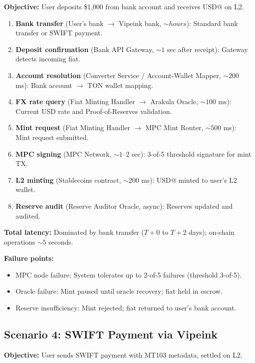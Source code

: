 \documentclass[12pt,a4paper]{article}
\theoremstyle{definition}
\theoremstyle{remark}
\newcommand{\USD}[1]{\$#1}
\begin{document}
\textbf{Objective:} User deposits \USD{1{,}000} from bank account and receives USD@ on L2.

\begin{enumerate}[nosep]
    \item \textbf{Bank transfer} (User's bank $\to$ Vipeink bank, ${\sim}hours$): Standard bank transfer or SWIFT payment.
    \item \textbf{Deposit confirmation} (Bank API Gateway, ${\sim}1$ sec after receipt): Gateway detects incoming fiat.
    \item \textbf{Account resolution} (Converter Service / Account-Wallet Mapper, ${\sim}200$ ms): Bank account $\to$ TON wallet mapping.
    \item \textbf{FX rate query} (Fiat Minting Handler $\to$ Arakula Oracle, ${\sim}100$ ms): Current USD rate and Proof-of-Reserves validation.
    \item \textbf{Mint request} (Fiat Minting Handler $\to$ MPC Mint Router, ${\sim}500$ ms): Mint request submitted.
    \item \textbf{MPC signing} (MPC Network, ${\sim}1$--$2$ sec): 3-of-5 threshold signature for mint TX.
    \item \textbf{L2 minting} (Stablecoins contract, ${\sim}200$ ms): USD@ minted to user's L2 wallet.
    \item \textbf{Reserve audit} (Reserve Auditor Oracle, async): Reserves updated and audited.
\end{enumerate}

\textbf{Total latency:} Dominated by bank transfer ($T+0$ to $T+2$ days); on-chain operations ${\sim}5$ seconds.

\textbf{Failure points:}
\begin{itemize}[nosep]
    \item MPC node failure: System tolerates up to 2-of-5 failures (threshold 3-of-5).
    \item Oracle failure: Mint paused until oracle recovery; fiat held in escrow.
    \item Reserve insufficiency: Mint rejected; fiat returned to user's bank account.
\end{itemize}

\subsection{Scenario 4: SWIFT Payment via Vipeink}

\textbf{Objective:} User sends SWIFT payment with MT103 metadata, settled on L2.
\end{document}
